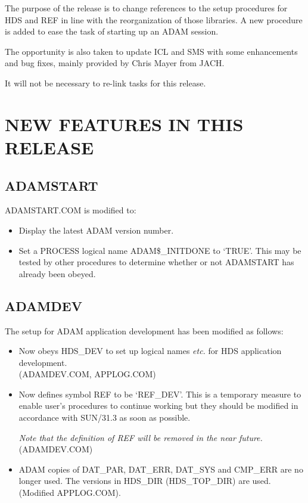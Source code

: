 The purpose of the release is to change references to the setup procedures
for HDS and REF in line with the reorganization of those libraries.
A new procedure is added to ease the task of starting up an ADAM session.

The opportunity is also taken to update ICL and SMS with some enhancements
and bug fixes, mainly provided by Chris Mayer from JACH.

It will not be necessary to re-link tasks for this release.

\section{NEW FEATURES IN THIS RELEASE}

\subsection{ADAMSTART}
ADAMSTART.COM is modified to:
\begin{itemize}
\item Display the latest ADAM version number.
\item Set a PROCESS logical name ADAM\$\_INITDONE to `TRUE'. This may be
tested by other procedures to determine whether or not ADAMSTART has
already been obeyed.
\end{itemize}

\subsection{ADAMDEV}
The setup for ADAM application development has been modified as follows:
\begin{itemize}
\item Now obeys HDS\_DEV to set up logical names {\em etc.} for HDS
application development.\\
(ADAMDEV.COM, APPLOG.COM)
\item Now defines symbol REF to be `REF\_DEV'.
This is a temporary measure to enable user's procedures to continue
working but they should be modified in accordance with SUN/31.3 as soon as
possible.

{\em Note that the definition of REF will be removed in the near future.}\\
(ADAMDEV.COM)
\item ADAM copies of DAT\_PAR, DAT\_ERR, DAT\_SYS and CMP\_ERR are
no longer used. The versions in HDS\_DIR (HDS\_TOP\_DIR) are used.\\
(Modified APPLOG.COM).
\end{itemize}


